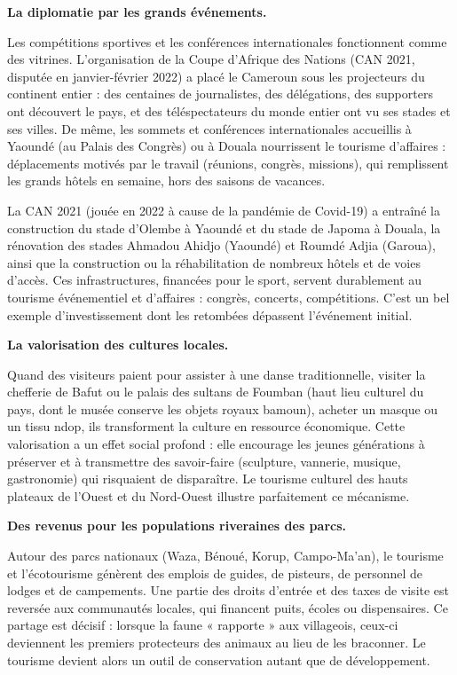 \documentclass[11pt]{article}
\newcommand{\cle}[1]{{\popxbold\color{popdark}#1}}
\newcounter{popsec}
\newcounter{popsub}
\newcommand{\courssub}[1]{%
  \stepcounter{popsub}%
  \par\vspace{9pt}\noindent{\popxbold\fontsize{11.5}{13}\selectfont\color{popink}{\color{poporange}\thepopsec.\thepopsub}\hspace{6pt}#1}\par\nopagebreak\vspace{4pt}
}
\begin{document}
\textbf{La diplomatie par les grands événements.}\par
Les compétitions sportives et les conférences internationales fonctionnent comme des vitrines. L'organisation de la \cle{Coupe d'Afrique des Nations} (CAN 2021, disputée en janvier-février 2022) a placé le Cameroun sous les projecteurs du continent entier : des centaines de journalistes, des délégations, des supporters ont découvert le pays, et des téléspectateurs du monde entier ont vu ses stades et ses villes. De même, les sommets et conférences internationales accueillis à Yaoundé (au Palais des Congrès) ou à Douala nourrissent le \cle{tourisme d'affaires} : déplacements motivés par le travail (réunions, congrès, missions), qui remplissent les grands hôtels en semaine, hors des saisons de vacances.

\begin{savaistu}
La CAN 2021 (jouée en 2022 à cause de la pandémie de Covid-19) a entraîné la construction du stade d'Olembe à Yaoundé et du stade de Japoma à Douala, la rénovation des stades Ahmadou Ahidjo (Yaoundé) et Roumdé Adjia (Garoua), ainsi que la construction ou la réhabilitation de nombreux hôtels et de voies d'accès. Ces infrastructures, financées pour le sport, servent durablement au \cle{tourisme événementiel} et d'affaires : congrès, concerts, compétitions. C'est un bel exemple d'investissement dont les retombées dépassent l'événement initial.
\end{savaistu}

\courssub{L'importance sociale du tourisme}

\textbf{La valorisation des cultures locales.}\par
Quand des visiteurs paient pour assister à une danse traditionnelle, visiter la chefferie de Bafut ou le palais des sultans de Foumban (haut lieu culturel du pays, dont le musée conserve les objets royaux bamoun), acheter un masque ou un tissu ndop, ils transforment la culture en \cle{ressource économique}. Cette valorisation a un effet social profond : elle encourage les jeunes générations à préserver et à transmettre des savoir-faire (sculpture, vannerie, musique, gastronomie) qui risquaient de disparaître. Le tourisme culturel des hauts plateaux de l'Ouest et du Nord-Ouest illustre parfaitement ce mécanisme.

\textbf{Des revenus pour les populations riveraines des parcs.}\par
Autour des parcs nationaux (Waza, Bénoué, Korup, Campo-Ma'an), le tourisme et l'écotourisme génèrent des emplois de guides, de pisteurs, de personnel de lodges et de campements. Une partie des droits d'entrée et des taxes de visite est reversée aux communautés locales, qui financent puits, écoles ou dispensaires. Ce partage est décisif : lorsque la faune « rapporte » aux villageois, ceux-ci deviennent les premiers protecteurs des animaux au lieu de les braconner. Le tourisme devient alors un outil de \cle{conservation} autant que de développement.
\end{document}

